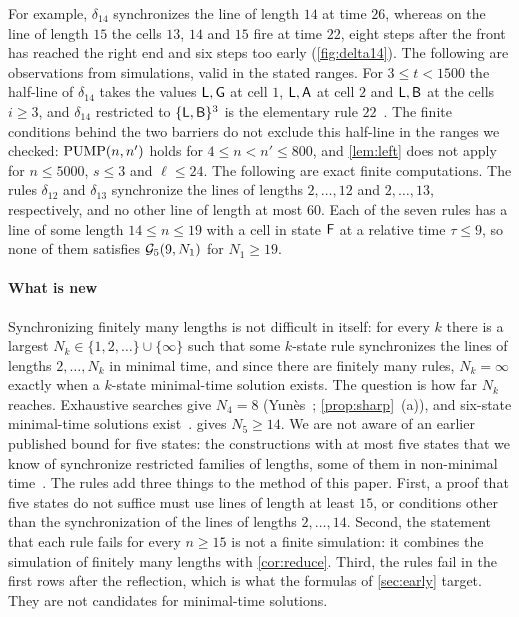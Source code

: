 For example, $\delta_{14}$ synchronizes the line of length $14$ at time $26$,
whereas on the line of length $15$ the cells $13$, $14$ and $15$ fire at time
$22$, eight steps after the front has reached the right end and six steps too
early (\cref{fig:delta14}). The following are observations from simulations,
valid in the stated ranges. For $3\le t<1500$ the half-line of $\delta_{14}$
takes the values $\mathsf L,\mathsf G$ at cell $1$, $\mathsf L,\mathsf A$ at cell $2$ and $\mathsf L,\mathsf B$ at
the cells $i\ge3$, and $\delta_{14}$ restricted to $\{\mathsf L,\mathsf B\}^3$ is the
elementary rule $22$~\cite{Wolfram83}. The finite conditions behind the two
barriers do not exclude this half-line in the ranges we checked: $\mathrm{PUMP}(n,n')$ holds for $4\le n<n'\le800$, and
\cref{lem:left} does not apply for $n\le5000$, $s\le3$ and $\ell\le24$. The
following are exact finite computations. The rules $\delta_{12}$ and
$\delta_{13}$ synchronize the lines of lengths $2,\dots,12$ and $2,\dots,13$,
respectively, and no other line of length at most $60$. Each of the seven rules
has a line of some length $14\le n\le19$ with a cell in state $\mathsf F$ at a
relative time $\tau\le9$, so none of them satisfies $\mathcal G_5(9,N_1)$ for
$N_1\ge19$.

\paragraph{What is new}
Synchronizing finitely many lengths is not difficult in itself: for every $k$
there is a largest $N_k\in\{1,2,\dots\}\cup\{\infty\}$ such that some $k$-state
rule synchronizes the lines of lengths $2,\dots,N_k$ in minimal time, and since
there are finitely many rules, $N_k=\infty$ exactly when a $k$-state
minimal-time solution exists. The question is how far $N_k$ reaches.
Exhaustive searches give $N_4=8$ (Yun\`es~\cite{Yunes93};
\cref{prop:sharp}~(a)), and six-state minimal-time solutions
exist~\cite{Mazoyer87}.  gives $N_5\ge14$. We are not aware
of an earlier published bound for five states: the constructions with at most
five states that we know of synchronize restricted families of lengths, some of them in non-minimal
time~\cite{UmeoYanagihara07,Yunes08}. The rules add three things to the method
of this paper. First, a proof that five states do not suffice must use lines of
length at least $15$, or conditions other than the synchronization of the lines
of lengths $2,\dots,14$. Second, the statement that each rule fails for every
$n\ge15$ is not a finite simulation: it combines the simulation of finitely
many lengths with \cref{cor:reduce}. Third, the rules fail in the first rows
after the reflection, which is what the formulas of \cref{sec:early} target.
They are not candidates for minimal-time solutions.

